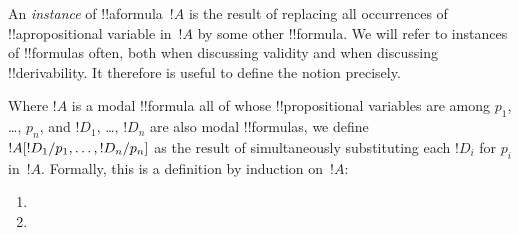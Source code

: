\documentclass[../../../include/open-logic-section]{subfiles}
\begin{document}


An \emph{instance} of !!a{formula}~$!A$ is the result of replacing all
occurrences of !!a{propositional variable} in~$!A$ by some other
!!{formula}. We will refer to instances of !!{formula}s often, both
when discussing validity and when discussing !!{derivability}. It
therefore is useful to define the notion precisely.

\begin{defn}
  Where $!A$ is a modal !!{formula} all of whose !!{propositional
    variable}s are among $p_1$, \dots, $p_n$, and $!D_1$, \dots,
  $!D_n$ are also modal !!{formula}s, we define
  $!A[!D_1/p_1, \dots, !D_n/p_n]$ as the
  result of simultaneously substituting each $!D_i$ for $p_i$
  in~$!A$. Formally, this is a definition by induction on~$!A$:
  \begin{enumerate}
    \item {}
    \item {}
\end{enumerate}
\end{defn}
\end{document}
